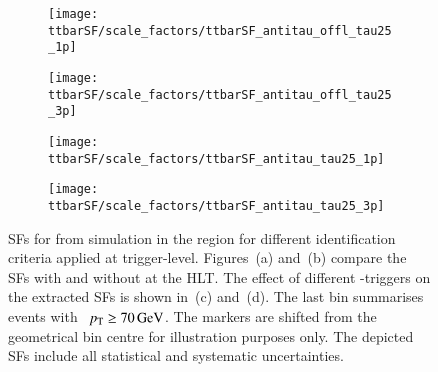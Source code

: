 \begin{figure}[htbp]
  \centering

  \begin{subfigure}[t]{.495\textwidth}
    \texttt{[image: ttbarSF/scale\_factors/ttbarSF\_antitau\_offl\_tau25\_1p]}
    \caption{}
    \label{fig:ttbarSF_antiid_SF_a}
  \end{subfigure}\hfill%
  \begin{subfigure}[t]{.495\textwidth}
    \texttt{[image: ttbarSF/scale\_factors/ttbarSF\_antitau\_offl\_tau25\_3p]}
    \caption{}
    \label{fig:ttbarSF_antiid_SF_b}
  \end{subfigure}

  \begin{subfigure}[t]{.495\textwidth}
    \texttt{[image: ttbarSF/scale\_factors/ttbarSF\_antitau\_tau25\_1p]}
    \caption{}
    \label{fig:ttbarSF_antiid_SF_c}
  \end{subfigure}\hfill%
  \begin{subfigure}[t]{.495\textwidth}
    \texttt{[image: ttbarSF/scale\_factors/ttbarSF\_antitau\_tau25\_3p]}
    \caption{}
    \label{fig:ttbarSF_antiid_SF_d}
  \end{subfigure}

  \caption{SFs for \faketauhadvis from \ttbar simulation in the \antiid region
    for different \tauhadvis identification criteria applied at trigger-level.
    Figures~(a) and~(b) compare the SFs with and without \tauid at the HLT. The
    effect of different \tauhadvis-triggers on the extracted SFs is shown in~(c)
    and~(d). The last bin summarises events with
    \tauhadvis~$\pT \geq \SI{70}{\GeV}$. The markers are shifted from the
    geometrical bin centre for illustration purposes only. The depicted SFs
    include all statistical and systematic uncertainties.}%
  \label{fig:ttbarSF_antiid_SF}
\end{figure}

